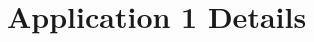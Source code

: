 \documentclass{llmxive}
\providecommand{\scoreBest}[1]{\cellcolor{green!35}\textbf{#1}}
\providecommand{\scoreHigh}[1]{\cellcolor{green!20}#1}
\providecommand{\scoreGood}[1]{\cellcolor{green!8}#1}
\providecommand{\scoreMid}[1]{\cellcolor{yellow!18}#1}
\providecommand{\scoreLow}[1]{\cellcolor{orange!18}#1}
\providecommand{\scoreWorst}[1]{\cellcolor{red!20}#1}
\begin{document}





\section{Application 1 Details}
\label{app:app1}
\end{document}
